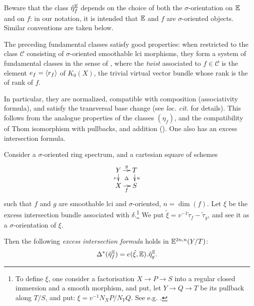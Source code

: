 \begin{rem}
Beware that the class $\tilde \eta_f^\mathbb E$ depends on the choice of
 both the $\sigma$-orientation on $\mathbb E$ and on $f$: in our notation,
 it is intended that $\mathbb E$ and $f$ are $\sigma$-oriented objects.
 Similar conventions are taken below.
\end{rem}

\begin{num}\label{num:sigma_fundamental_classes_ppty}
The preceding fundamental classes satisfy good properties: 
 when restricted to the class $\mathcal C$ consisting of $\sigma$-oriented smoothable lci morphisms,
 they form a system of fundamental classes in the sense of \cite[Def. 2.3.4]{DJK},
 where the \emph{twist} associated to $f \in \mathcal C$ is the element
 $e_f=\langle r_f \rangle$ of $K_0(X)$, the trivial virtual vector bundle whose rank is the of rank of $f$.

In particular, they are normalized, compatible with composition (associativity formula),
 and satisfy the transversal base change (see \emph{loc. cit.} for details). This follows
 from the analogue properties of the classes $(\eta_f)$, and the compatibility of Thom isomorphism
 with pullbacks, and addition ().
 One also has an excess intersection formula.
\end{num}
\begin{prop}\label{prop:sigma_excess_intersection}
Consider a $\sigma$-oriented ring spectrum, and a cartesian square of schemes
$$
\xymatrix@=10pt{
Y\ar^g[r]\ar_v[d]\ar@{}|\Delta[rd] & T\ar^u[d] \\
X\ar_f[r] & S
}
$$
such that $f$ and $g$ are smoothable lci and $\sigma$-oriented, $n=\dim(f)$.
 Let $\xi$ be the excess intersection bundle associated with
 $\delta$.\footnote{To define $\xi$, one consider a factorisation $X \rightarrow P \rightarrow S$
 into a regular closed immersion and a smooth morphism, and put, let $Y \rightarrow Q \rightarrow T$
 be its pullback along $T/S$, and put: $\xi=v^{-1}N_XP/N_YQ$. See e.g. \cite[3.3.3]{DJK}.}
 We put $\tilde \xi=v^{-1}\tilde \tau_f-\tilde \tau_g$, and see it as a $\sigma$-orientation of $\xi$.

Then the following \emph{excess intersection formula} holds in $\mathbb E^{2n,n}(Y/T)$:
$$
\Delta^*(\tilde \eta^\mathbb E_f)=e(\tilde \xi,\mathbb E).\tilde \eta^\mathbb E_g.
$$
\end{prop}

